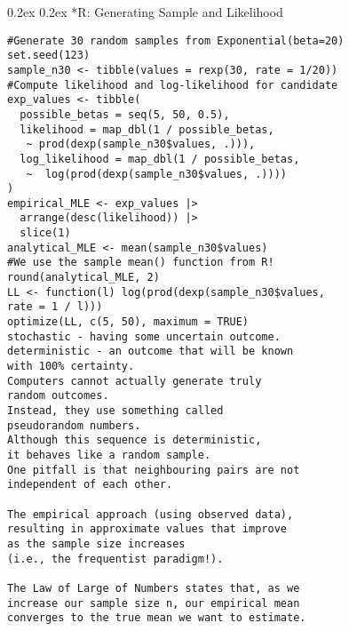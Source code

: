 \documentclass[8pt,landscape]{article}
\makeatletter
\renewcommand{\subsection}{\@startsection{subsection}{2}{0pt}%
    {0.2ex}%
    {0.2ex}%
    {\fontsize{8}{8}\bfseries}} %
\makeatother
\begin{document}
\begin{multicols}{3}
\subsection*{R: Generating Sample and Likelihood}
\begin{verbatim}
#Generate 30 random samples from Exponential(beta=20)
set.seed(123)
sample_n30 <- tibble(values = rexp(30, rate = 1/20))
#Compute likelihood and log-likelihood for candidate
exp_values <- tibble(
  possible_betas = seq(5, 50, 0.5),
  likelihood = map_dbl(1 / possible_betas, 
   ~ prod(dexp(sample_n30$values, .))),
  log_likelihood = map_dbl(1 / possible_betas, 
   ~  log(prod(dexp(sample_n30$values, .))))
)
empirical_MLE <- exp_values |>
  arrange(desc(likelihood)) |>
  slice(1)
analytical_MLE <- mean(sample_n30$values) 
#We use the sample mean() function from R!
round(analytical_MLE, 2)
LL <- function(l) log(prod(dexp(sample_n30$values,
rate = 1 / l)))
optimize(LL, c(5, 50), maximum = TRUE)
stochastic - having some uncertain outcome. 
deterministic - an outcome that will be known 
with 100% certainty.
Computers cannot actually generate truly 
random outcomes. 
Instead, they use something called 
pseudorandom numbers.
Although this sequence is deterministic, 
it behaves like a random sample. 
One pitfall is that neighbouring pairs are not 
independent of each other.

The empirical approach (using observed data),
resulting in approximate values that improve 
as the sample size increases 
(i.e., the frequentist paradigm!).

The Law of Large of Numbers states that, as we 
increase our sample size n, our empirical mean 
converges to the true mean we want to estimate.
\end{verbatim}
\end{multicols}
\end{document}
